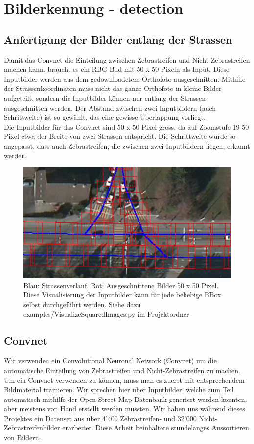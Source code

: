 \section{Bilderkennung - detection}

\subsection{Anfertigung der Bilder entlang der Strassen}
Damit das Convnet die Einteilung zwischen Zebrastreifen und Nicht-Zebrastreifen machen kann, braucht es ein RBG Bild mit 50 x 50 Pixeln als Input. Diese Inputbilder werden aus dem gedownloadetem Orthofoto ausgeschnitten. Mithilfe der Strassenkoordinaten muss nicht das ganze Orthofoto in kleine Bilder aufgeteilt, sondern die Inputbilder können nur entlang der Strassen ausgeschnitten werden. Der Abstand zwischen zwei Inputbildern (auch Schrittweite) ist so gewählt, das eine gewisse Überlappung vorliegt.
\\
Die Inputbilder für das Convnet sind 50 x 50 Pixel gross, da auf Zoomstufe 19 50 Pixel etwa der Breite von zwei Strassen entspricht. Die Schrittweite wurde so angepasst, dass auch Zebrastreifen, die zwischen zwei Inputbildern liegen, erkannt werden.
\\
\begin{figure}[H]
	\centering
	\includegraphics{images/squared_images.png}
	\caption{Blau: Strassenverlauf, Rot: Ausgeschnittene Bilder 50 x 50 Pixel. Diese Visualisierung der Inputbilder kann für jede beliebige BBox selbst durchgeführt werden. Siehe dazu examples/VisualizeSquaredImages.py im Projektordner}
\end{figure}



\subsection{Convnet}
Wir verwenden ein Convolutional Neuronal Network (Convnet) um die automatische Einteilung von Zebrastreifen und Nicht-Zebrastreifen zu machen. Um ein Convnet verwenden zu können, muss man es zuerst mit entsprechendem Bildmaterial trainieren. Wir sprechen hier über Inputbilder, welche zum Teil automatisch mithilfe der Open Street Map Datenbank generiert werden konnten, aber meistens von Hand erstellt werden mussten. Wir haben uns während dieses Projektes ein Datenset aus über 4'400 Zebrastreifen- und 32'000 Nicht-Zebrastreifenbilder erarbeitet. Diese Arbeit beinhaltete stundelanges Aussortieren von Bildern.
\\

